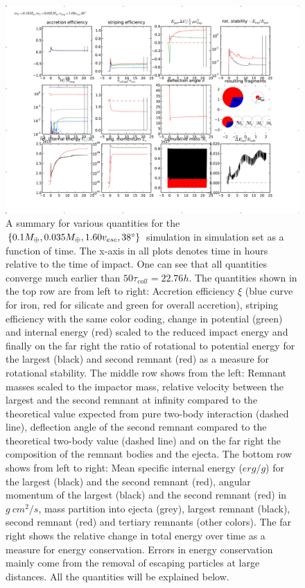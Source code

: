 \begin{figure}[htbp]
\begin{center}
\includegraphics[scale=0.6]{31_sim_summary.pdf}
\caption{A summary for various quantities for the $\{0.1 M_{\oplus}, 0.035 M_{\oplus}, 1.60 v_{esc}, 38 ^\circ \}$ simulation in simulation set \css as a function of time. The x-axis in all plots denotes time in hours relative to the time of impact. One can see that all quantities converge much earlier than $50 \tau_{coll} = 22.76h$. The quantities shown in the top row are from left to right: Accretion efficiency $\xi$ (blue curve for iron, red for silicate and green for overall accretion), striping efficiency with the same color coding, change in potential (green) and internal energy (red) scaled to the reduced impact energy and finally on the far right the ratio of rotational to potential energy for the largest (black) and second remnant (red) as a measure for rotational stability. The middle row shows from the left: Remnant masses scaled to the impactor mass, relative velocity between the largest and the second remnant at infinity compared to the theoretical value expected from pure two-body interaction (dashed line), deflection angle of the second remnant compared to the theoretical two-body value (dashed line) and on the far right the composition of the remnant bodies and the ejecta. The bottom row shows from left to right: Mean specific internal energy ($erg/g$) for the largest (black) and the second remnant (red), angular momentum of the largest (black) and the second remnant (red) in $g~cm^2 / s$, mass partition into ejecta (grey), largest remnant (black), second remnant (red) and tertiary remnants (other colors). The far right shows the relative change in total energy over time as a measure for energy conservation. Errors in energy conservation mainly come from the removal of escaping particles at large distances. All the quantities will be explained below.}
\label{ch03_fig31}
\end{center}
\end{figure}
